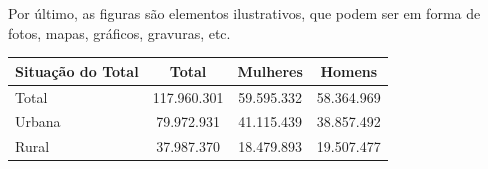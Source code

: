 \documentclass{jornada} %
\begin{document}
Por último, as figuras são elementos ilustrativos, que podem ser em forma de fotos, mapas, gráficos, gravuras, etc.

\begin{table}[H]
{
\begin{tabular}{m{2.0cm}ccc}
 \toprule
 Situação do Total & Total & Mulheres & Homens \\
\midrule
Total & 117.960.301 & 59.595.332 & 58.364.969 \\
Urbana & 79.972.931 & 41.115.439 & 38.857.492 \\
Rural & 37.987.370 & 18.479.893 & 19.507.477 \\
\bottomrule
\end{tabular}
}
{
}
\end{table}
		
\end{document}
